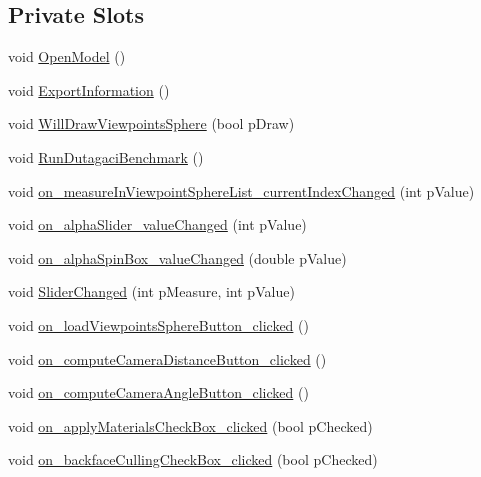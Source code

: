 \subsection*{Private Slots}
\begin{DoxyCompactItemize}
\item 
void \hyperlink{class_main_module_controller_a32e7b8321404d2df123941341e79fd2a}{Open\+Model} ()
\item 
void \hyperlink{class_main_module_controller_a13f267da68a95d65e87679fc0f34ebc5}{Export\+Information} ()
\item 
void \hyperlink{class_main_module_controller_ac2b3b0b64c8809beaeaedca4dee22af4}{Will\+Draw\+Viewpoints\+Sphere} (bool p\+Draw)
\item 
void \hyperlink{class_main_module_controller_a17c78ef7e06fe023458e1c6cc41b483a}{Run\+Dutagaci\+Benchmark} ()
\item 
void \hyperlink{class_main_module_controller_a2c1aa5427fc76e8deb96cbc0a68d23e4}{on\+\_\+measure\+In\+Viewpoint\+Sphere\+List\+\_\+current\+Index\+Changed} (int p\+Value)
\item 
void \hyperlink{class_main_module_controller_ac64296e8775142921413923c9fa6533d}{on\+\_\+alpha\+Slider\+\_\+value\+Changed} (int p\+Value)
\item 
void \hyperlink{class_main_module_controller_ad1a19465ecb00ec461cf2dd8835ba8f2}{on\+\_\+alpha\+Spin\+Box\+\_\+value\+Changed} (double p\+Value)
\item 
void \hyperlink{class_main_module_controller_a9a1d2d59115ab85608cadf032d25df86}{Slider\+Changed} (int p\+Measure, int p\+Value)
\item 
void \hyperlink{class_main_module_controller_aff572d556a63bf38d89523035db6d693}{on\+\_\+load\+Viewpoints\+Sphere\+Button\+\_\+clicked} ()
\item 
void \hyperlink{class_main_module_controller_afe0fbdd71987a496d6eef050112f2bc0}{on\+\_\+compute\+Camera\+Distance\+Button\+\_\+clicked} ()
\item 
void \hyperlink{class_main_module_controller_aae98bf10137c2e9e31c19489eef8a4b5}{on\+\_\+compute\+Camera\+Angle\+Button\+\_\+clicked} ()
\item 
void \hyperlink{class_main_module_controller_aafc18dde340c9f3bdd7a16912cdb2cd7}{on\+\_\+apply\+Materials\+Check\+Box\+\_\+clicked} (bool p\+Checked)
\item 
void \hyperlink{class_main_module_controller_a565c4bbbe8dc19a12b24443ef69d85b3}{on\+\_\+backface\+Culling\+Check\+Box\+\_\+clicked} (bool p\+Checked)
\item 

\end{DoxyCompactItemize}
